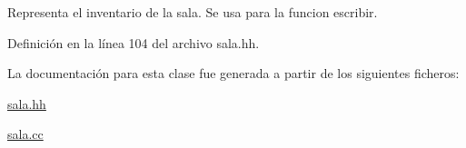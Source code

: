 Representa el inventario de la sala. Se usa para la funcion escribir. 



Definición en la línea 104 del archivo sala.\+hh.



La documentación para esta clase fue generada a partir de los siguientes ficheros\+:\begin{DoxyCompactItemize}
\item 
\mbox{\hyperlink{sala_8hh}{sala.\+hh}}\item 
\mbox{\hyperlink{sala_8cc}{sala.\+cc}}\end{DoxyCompactItemize}

